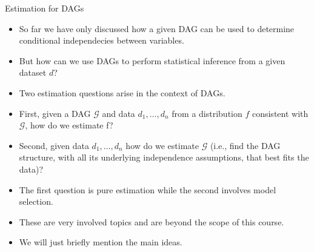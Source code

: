 \documentclass[handout]{beamer}
\begin{document}
\begin{frame}{Estimation for DAGs}
\scriptsize{
\begin{itemize}
\item So far we have only discussed how a given DAG can be used to determine conditional independecies between variables.

\item But how can we use DAGs to perform statistical inference from a given dataset $d$?

\item Two estimation questions arise in the context of DAGs. 
\item First, given a DAG $\mathcal{G}$ and data $d_1,\dots,d_n$ from a distribution $f$ consistent with $\mathcal{G}$, how do we estimate f?

\item Second, given data $d_1,\dots,d_n$ how do we estimate $\mathcal{G}$ (i.e., find the DAG structure, with all its underlying independence assumptions, that best fits the data)?

\item The first question is pure estimation while the second involves model selection.

\item These are very involved topics and are beyond the scope of this course.

\item We will just briefly mention the main ideas.

 
\end{itemize}



} 

\end{frame}
\end{document}
